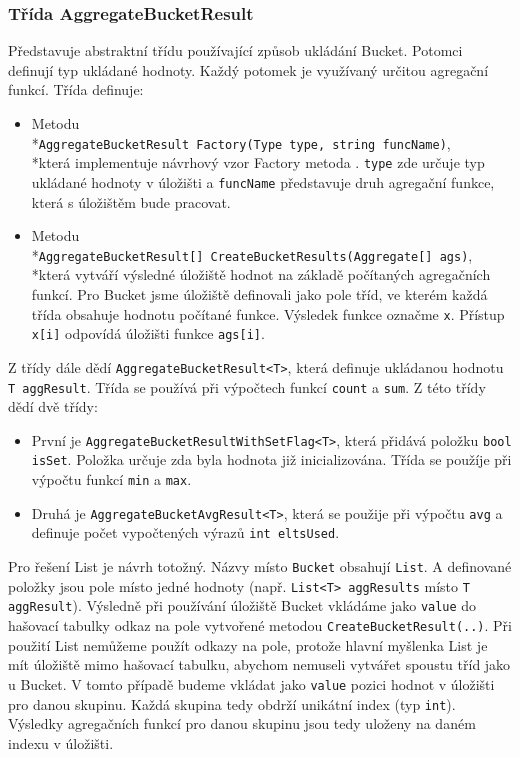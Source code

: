 \subsubsection{Třída AggregateBucketResult}

Představuje abstraktní třídu používající způsob ukládání Bucket.
Potomci definují typ ukládané hodnoty.
Každý potomek je využívaný určitou agregační funkcí.
Třída definuje:
\begin{itemize}
\item Metodu \\*\texttt{AggregateBucketResult Factory(Type type, string funcName)}, \\*která implementuje návrhový vzor Factory metoda \citep[str. 107]{patterns}.
\texttt{type} zde určuje typ ukládané hodnoty v úložišti a \texttt{funcName} představuje druh agregační funkce, která s úložištěm bude pracovat.
\item Metodu \\*\texttt{AggregateBucketResult[] CreateBucketResults(Aggregate[] ags)}, \\*která vytváří výsledné úložiště hodnot na základě počítaných agregačních funkcí.
Pro Bucket jsme úložiště definovali jako pole tříd, ve kterém každá třída obsahuje hodnotu počítané funkce.
Výsledek funkce označme \texttt{x}. 
Přístup \texttt{x[i]} odpovídá úložišti funkce \texttt{ags[i]}.
\end{itemize}
Z třídy dále dědí \texttt{AggregateBucketResult<T>}, která definuje ukládanou hodnotu \texttt{T aggResult}.
Třída se používá při výpočtech funkcí \texttt{count} a \texttt{sum}.
Z této třídy dědí dvě třídy:
\begin{itemize}
\item První je \texttt{AggregateBucketResultWithSetFlag<T>}, která přidává položku \texttt{bool isSet}.
Položka určuje zda byla hodnota již inicializována.
Třída se použíje při výpočtu funkcí \texttt{min} a \texttt{max}.
\item Druhá je \texttt{AggregateBucketAvgResult<T>}, která se použije při výpočtu \texttt{avg} a definuje počet vypočtených výrazů \texttt{int eltsUsed}.
\end{itemize}

Pro řešení List je návrh totožný.
Názvy místo \texttt{Bucket} obsahují \texttt{List}.
A definované položky jsou pole místo jedné hodnoty (např. \texttt{List<T> aggResults} místo \texttt{T aggResult}).
Výsledně při používání úložiště Bucket vkládáme jako \texttt{value} do hašovací tabulky odkaz na pole vytvořené metodou \texttt{CreateBucketResult(..)}.
Při použití List nemůžeme použít odkazy na pole, protože hlavní myšlenka List je mít úložiště mimo hašovací tabulku, abychom nemuseli vytvářet spoustu tříd jako u Bucket.
V tomto případě budeme vkládat jako \texttt{value} pozici hodnot v úložišti pro danou skupinu.
Každá skupina tedy obdrží unikátní index (typ \texttt{int}).
Výsledky agregačních funkcí pro danou skupinu jsou tedy uloženy na daném indexu v úložišti.

